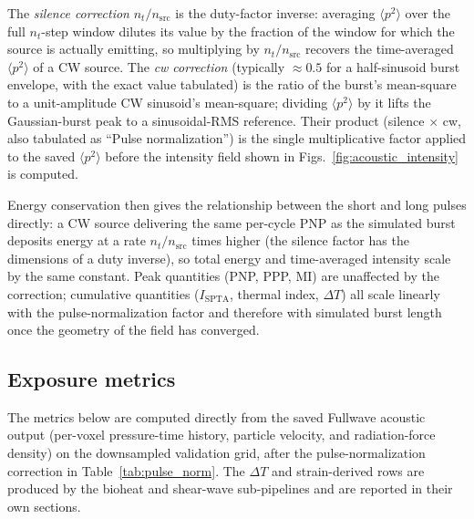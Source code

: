 \documentclass[11pt,letterpaper]{article}
\begin{document}
The \emph{silence correction} $n_t / n_{\mathrm{src}}$ is the duty-factor inverse: averaging $\langle p^2 \rangle$ over the full $n_t$-step window dilutes its value by the fraction of the window for which the source is actually emitting, so multiplying by $n_t / n_{\mathrm{src}}$ recovers the time-averaged $\langle p^2 \rangle$ of a CW source.  The \emph{cw correction} (typically $\approx 0.5$ for a half-sinusoid burst envelope, with the exact value tabulated) is the ratio of the burst's mean-square to a unit-amplitude CW sinusoid's mean-square; dividing $\langle p^2 \rangle$ by it lifts the Gaussian-burst peak to a sinusoidal-RMS reference.  Their product (silence $\times$ cw, also tabulated as ``Pulse normalization'') is the single multiplicative factor applied to the saved $\langle p^2 \rangle$ before the intensity field shown in Figs.~\ref{fig:acoustic_intensity} is computed.

Energy conservation then gives the relationship between the short and long pulses directly: a CW source delivering the same per-cycle PNP as the simulated burst deposits energy at a rate $n_t / n_{\mathrm{src}}$ times higher (the silence factor has the dimensions of a duty inverse), so total energy and time-averaged intensity scale by the same constant.  Peak quantities (PNP, PPP, MI) are unaffected by the correction; cumulative quantities ($I_{\mathrm{SPTA}}$, thermal index, $\Delta T$) all scale linearly with the pulse-normalization factor and therefore with simulated burst length once the geometry of the field has converged.

\subsection{Exposure metrics}\label{sec:exposure_metrics}

The metrics below are computed directly from the saved Fullwave acoustic
output (per-voxel pressure-time history, particle velocity, and
radiation-force density) on the downsampled validation grid, after the
pulse-normalization correction in Table~\ref{tab:pulse_norm}.  The
$\Delta T$ and strain-derived rows are produced by the bioheat and
shear-wave sub-pipelines and are reported in their own sections.
\end{document}
